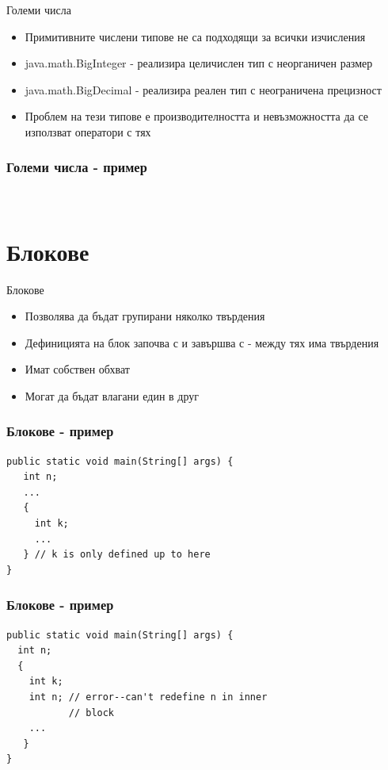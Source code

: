 \documentclass{beamer}
\begin{document}
\begin{frame}{Големи числа}
  \transdissolve
  \begin{itemize}
  \item Примитивните числени типове не са подходящи за всички изчисления
  \item java.math.BigInteger - реализира целичислен тип с неорганичен размер
  \item java.math.BigDecimal - реализира реален тип с неограничена прецизност
  \item Проблем на тези типове е производителността и невъзможността
    да се използват оператори с тях
  \end{itemize}
\end{frame}

\begin{frame}[fragile]
  \frametitle{Големи числа - пример}
  \transdissolve
\begin{lstlisting}
  
\end{lstlisting}
\end{frame}

\section{Блокове}
\begin{frame}{Блокове}
  \transdissolve
  \begin{itemize}
  \item Позволява да бъдат групирани няколко
    твърдения
   \item Дефиницията на блок започва с { и
      завършва с } - между тях има
    твърдения
   \item Имат собствен обхват
   \item Могат да бъдат влагани един в друг
  \end{itemize}
\end{frame}

\begin{frame}[fragile]
  \transdissolve
  \frametitle{Блокове - пример}
\begin{lstlisting}
public static void main(String[] args) {
   int n;
   ...
   {
     int k;
     ... 
   } // k is only defined up to here
}
\end{lstlisting}
\end{frame}

\begin{frame}[fragile]
  \frametitle{Блокове - пример}
  \transdissolve
\begin{lstlisting}
public static void main(String[] args) {
  int n;
  {
    int k;
    int n; // error--can't redefine n in inner
           // block
    ...
   } 
}
\end{lstlisting}
\end{frame}
\end{document}
